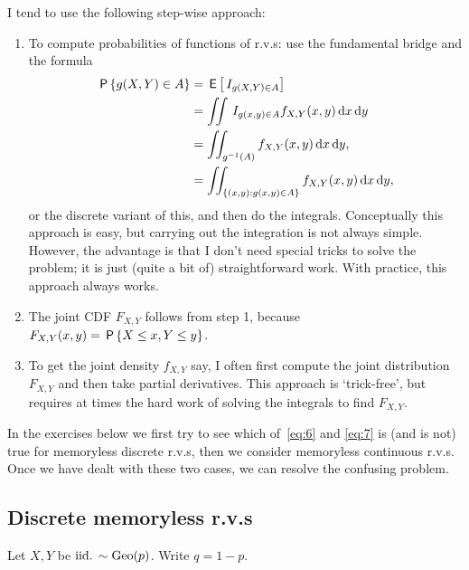 \documentclass[a4paper,12pt]{article}
\begin{document}
I tend to use the following step-wise approach:
\begin{enumerate}
\item To compute probabilities of functions of r.v.s: use the fundamental bridge and the formula
  \begin{equation}
    \label{eq:55}
    \begin{split}
\P{g(X, Y) \in A} 
&= \E{\1{g(X,Y)\in A}} \\
&= \iint \1{g(x,y) \in A} f_{X,Y}(x,y) \d x \d y \\
&= \iint_{g^{-1}(A)} f_{X,Y}(x, y) \d x \d y,\\
&= \iint_{\{(x,y): g(x,y) \in A\}} f_{X,Y}(x,y) \d x \d y,
    \end{split}
  \end{equation}
or the discrete variant of this, and then do the integrals.
Conceptually this approach is easy, but carrying out the integration is not always simple.
However, the advantage is that I don't need special tricks to solve the problem; it is just (quite a bit of) straightforward work.
With practice, this approach always works.
\item The joint CDF $F_{X,Y}$ follows from step 1, because $F_{X,Y}(x,y) = \P{X\leq x, Y\leq y}$.
\item To get the joint density $f_{X,Y}$ say, I often first compute the joint distribution $F_{X,Y}$ and then take partial derivatives.
  This approach is `trick-free', but requires at times the hard work of solving the integrals to find $F_{X,Y}$.
\end{enumerate}

In the exercises below we first try to see which of~\cref{eq:6} and \cref{eq:7} is (and is not) true for memoryless discrete r.v.s, then we consider memoryless continuous r.v.s. Once we have dealt with these two cases, we can  resolve the confusing problem.


\subsection{Discrete memoryless r.v.s}
\label{sec:set-1}


Let $X,Y$ be $\iid \sim \Geo{p}$. Write $q = 1-p$.
\end{document}
